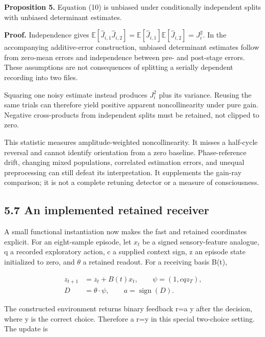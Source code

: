 \documentclass[
  american,
  11pt,
  letterpaper,
]{article}
\begin{document}
\textbf{Proposition 5.} Equation (10) is unbiased under conditionally independent splits with unbiased determinant estimates.

\textbf{Proof.} Independence gives \(\mathbb E[\widehat J_{i,1}\widehat J_{i,2}]=\mathbb E[\widehat J_{i,1}]\mathbb E[\widehat J_{i,2}]=J_i^2\). In the accompanying additive-error construction, unbiased determinant estimates follow from zero-mean errors and independence between pre- and post-stage errors. These assumptions are not consequences of splitting a serially dependent recording into two files.

Squaring one noisy estimate instead produces \(J_i^2\) plus its variance. Reusing the same trials can therefore yield positive apparent noncollinearity under pure gain. Negative cross-products from independent splits must be retained, not clipped to zero.

This statistic measures amplitude-weighted noncollinearity. It misses a half-cycle reversal and cannot identify orientation from a zero baseline. Phase-reference drift, changing mixed populations, correlated estimation errors, and unequal preprocessing can still defeat its interpretation. It supplements the gain-ray comparison; it is not a complete retuning detector or a measure of consciousness.

\subsection{5.7 An implemented retained receiver}\label{an-implemented-retained-receiver}

A small functional instantiation now makes the fast and retained coordinates explicit. For an eight-sample episode, let \(x_t\) be a signed sensory-feature analogue, q a recorded exploratory action, c a supplied context sign, z an episode state initialized to zero, and \(\theta\) a retained readout. For a receiving basis B(t),

\begin{equation}
\begin{aligned}z_{t+1}&=z_t+B(t)x_t,\qquad\psi=(1,cqz_T),\\ D&=\theta\mathbin{\cdot}\psi,\qquad a=\operatorname{sign}(D).\end{aligned}\tag{11}
\end{equation}

The constructed environment returns binary feedback r=a y after the decision, where y is the correct choice. Therefore a r=y in this special two-choice setting. The update is
\end{document}
